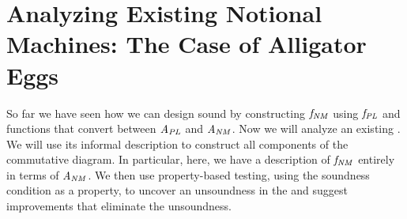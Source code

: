\section{Analyzing Existing Notional Machines: The Case of Alligator Eggs}
\label{chr:RevealingInconsistencies}

So far we have seen
how we can design sound \nms{} by
constructing \ensuremath{\Varid{f}_{\Conid{NM}}} using \ensuremath{\Varid{f}_{\Conid{PL}}} and
functions that convert between \ensuremath{\Conid{A}_{\Conid{PL}}} and \ensuremath{\Conid{A}_{\Conid{NM}}}.
%
Now we will analyze an existing \nm{}.
We will use its informal description to construct all components of the commutative diagram.
In particular, here,
we have a description
of \ensuremath{\Varid{f}_{\Conid{NM}}} entirely in terms of \ensuremath{\Conid{A}_{\Conid{NM}}}.
%
We then use property-based testing, using the soundness condition as a property,
to uncover an unsoundness in the \nm{}
and suggest improvements that eliminate the unsoundness.












